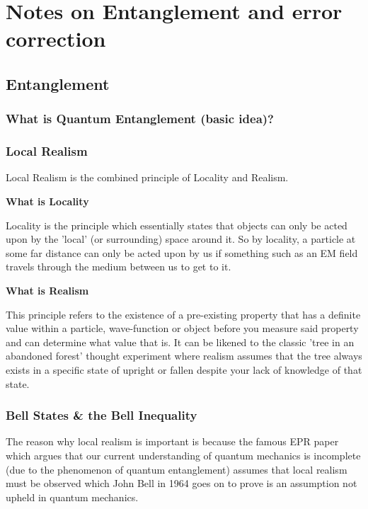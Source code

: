 
\section{Notes on Entanglement and error correction}
\subsection{Entanglement}
\subsubsection{What is Quantum Entanglement (basic idea)?}

\subsubsection{Local Realism}
Local Realism is the combined principle of Locality and Realism.
\vspace{1em}

\textbf{What is Locality}

Locality is the principle which essentially states that objects can only be acted upon by the 'local' (or surrounding) space around it. So by locality, a particle at some far distance can only be acted upon by us if something such as an EM field travels through the medium between us to get to it.
\vspace{1em}

\textbf{What is Realism}

This principle refers to the existence of a pre-existing property that has a definite value within a particle, wave-function or object before you measure said property and can determine what value that is. It can be likened to the classic 'tree in an abandoned forest' thought experiment where realism assumes that the tree always exists in a specific state of upright or fallen despite your lack of knowledge of that state.
\vspace{1em}

\subsubsection{Bell States \& the Bell Inequality}
The reason why local realism is important is because the famous EPR paper which argues that our current understanding of quantum mechanics is incomplete (due to the phenomenon of quantum entanglement) assumes that local realism must be observed which John Bell in 1964 goes on to prove is an assumption not upheld in quantum mechanics. \\

